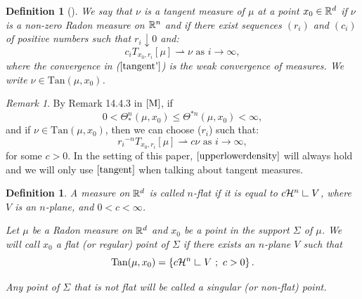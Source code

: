 \documentclass[11pt]{article}
\newtheorem{definition}[theorem]{Definition}
\theoremstyle{definition}
\theoremstyle{remark}
\newtheorem{remark}{Remark}[section]
\numberwithin{equation}{section}
\newcommand{\res}{\hbox{{\vrule height .22cm}{\leaders\hrule\hskip .2cm}}}
\def\res{\hbox{ {\vrule height .22cm}{\leaders\hrule\hskip.2cm} } }
\begin{document}
\begin{definition}[\cite{P}]\label{tangent*}
We say that $\nu$ is a tangent measure of $\mu$ at a point $x_0 \in \mathbb{R}^d$ if $\nu$ is a non-zero Radon measure on $\mathbb{R}^n$ and if there exist sequences $(r_i)$ and $(c_i)$ of positive numbers such that $r_i \downarrow 0$ and:
\begin{equation} \label{tangent'}
c_i T_{x_0,r_i}[\mu]\rightharpoonup \nu \text{ as } i \rightarrow \infty, 
\end{equation}
where the convergence in ($\ref{tangent'}$) is the weak convergence of measures.
We write $\nu \in \mbox{Tan}(\mu,x_0)$.
 \end{definition}

\begin{remark}
 By Remark 14.4.3 in $\cite{M}$, if 
 \begin{equation} \label{upperlowerdensity}
 0< \Theta_{*}^{n}(\mu,x_0) \leq \Theta^{* n}(\mu,x_0) <\infty,
 \end{equation}
 and if $\nu \in \text{Tan}(\mu,x_0)$, then we can choose ($r_i$) such that:
 \begin{equation} \label{tangent}
 {r_{i}}^{-n} T_{x_0,r_i}[\mu]\rightharpoonup c \nu \text{ as } i \rightarrow \infty,
 \end{equation}
for some $c>0$. In the setting of this paper, $\eqref{upperlowerdensity}$ will always hold and we will only use $\eqref{tangent}$ when talking about tangent measures.
\end{remark}
\begin{definition}\label{flat}
A measure  on $\mathbb{R}^d$ is called $n$-flat if it is equal to $ c \mathcal{H}^{n} \res V$, where $V$ is an $n$-plane, and $0<c<\infty$.

Let $\mu$ be a Radon measure on $\mathbb{R}^d$ and $x_0$  be a point in the support $\Sigma$ of $\mu$. We will call $x_0$ a flat (or regular) point of $\Sigma$ if there exists an $n$-plane $V$ such that
\begin{equation}\label{flatpoint}
\text{Tan}(\mu,x_0)= \left\lbrace c \mathcal{H}^{n} \res V \ ; \ c >0 \right\rbrace. 
\end{equation}

Any point of $\Sigma$ that is not flat will be called a singular (or non-flat) point.

\end{definition}
\end{document}
